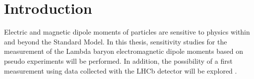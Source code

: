 \chapter*{Introduction}

Electric and magnetic dipole moments of particles are sensitive to physics within and beyond the Standard Model. In this thesis, sensitivity studies for the measurement of the Lambda baryon electromagnetic dipole moments based on pseudo experiments will be performed. In addition, the possibility of a first measurement using data collected with the LHCb detector will be explored \cite{emdipolesearch}. 
